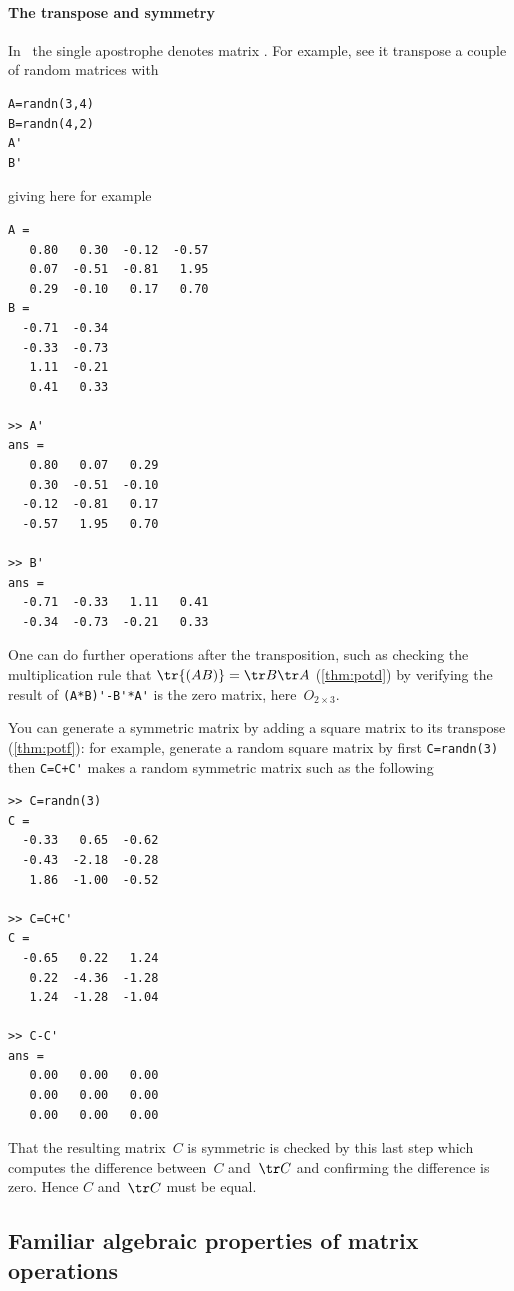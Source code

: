 \paragraph{The transpose and symmetry}
In \script\ the single apostrophe denotes matrix .
For example, see it transpose a couple of random matrices with
\begin{verbatim}
A=randn(3,4)
B=randn(4,2)
A'
B'
\end{verbatim}
\setbox\ajrqrbox\hbox{}%
\marginpar{\usebox{\ajrqrbox\\[2ex]}}%
giving here for example \twodp
\begin{verbatim}
A =
   0.80   0.30  -0.12  -0.57
   0.07  -0.51  -0.81   1.95
   0.29  -0.10   0.17   0.70
B =
  -0.71  -0.34
  -0.33  -0.73
   1.11  -0.21
   0.41   0.33

>> A'
ans =
   0.80   0.07   0.29
   0.30  -0.51  -0.10
  -0.12  -0.81   0.17
  -0.57   1.95   0.70

>> B'
ans =
  -0.71  -0.33   1.11   0.41
  -0.34  -0.73  -0.21   0.33
\end{verbatim}
One can do further operations after the transposition, such as checking the multiplication rule that \(\tr{(AB)}=\tr B\tr A\) (\autoref{thm:potd}) by verifying the result of \verb|(A*B)'-B'*A'| is the zero matrix, here~\(O_{2\times3}\).

You can generate a symmetric matrix by adding a square matrix to its transpose (\autoref{thm:potf}): for example, generate a random square matrix by first \verb|C=randn(3)| then \verb|C=C+C'| makes a random symmetric matrix such as the following \twodp
\begin{verbatim}
>> C=randn(3)
C =
  -0.33   0.65  -0.62
  -0.43  -2.18  -0.28
   1.86  -1.00  -0.52

>> C=C+C'
C =
  -0.65   0.22   1.24
   0.22  -4.36  -1.28
   1.24  -1.28  -1.04

>> C-C'
ans =
   0.00   0.00   0.00
   0.00   0.00   0.00
   0.00   0.00   0.00
\end{verbatim}
That the resulting matrix~\(C\) is symmetric is checked by this last step which computes the difference between~\(C\) and~\(\tr C\) and confirming the difference is zero. 
Hence \(C\) and~\(\tr C\) must be equal.






\subsection{Familiar algebraic properties of matrix operations}
\label{sec:fapmo}


